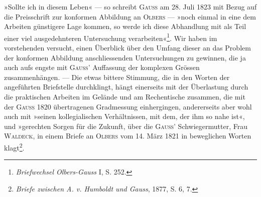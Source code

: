»Sollte ich in diesem Leben« — so schreibt \textsc{Gauss} am 28. Juli 1823 mit
Bezug auf die Preisschrift zur konformen Abbildung an \textsc{Olbers} — »noch einmal
in eine dem Arbeiten günstigere Lage kommen, so werde ich diese Abhandlung
mit als Teil einer viel ausgedehnteren Untersuchung verarbeiten«\footnote{\textit{Briefwechsel Olbers-Gauss} I, S. 252.}.
Wir haben im vorstehenden versucht, einen Überblick über den Umfang dieser
an das Problem der konformen Abbildung anschliessenden Untersuchungen zu
gewinnen, die ja auch aufs engste mit \textsc{Gauss}' Auffassung der komplexen
Grössen zusammenhängen. — Die etwas bittere Stimmung, die in den Worten
der angeführten Briefstelle durchklingt, hängt einerseits mit der Überlastung
durch die praktischen Arbeiten im Gelände und am Rechentische zusammen,
die mit der \textsc{Gauss} 1820 übertragenen Gradmessung einhergingen, andererseits
aber wohl auch mit »seinen kollegialischen Verhältnissen, mit dem, der ihm
so nahe ist«, und »gerechten Sorgen für die Zukunft, über die \textsc{Gauss}' Schwiegermutter,
Frau \textsc{Waldeck}, in einem Briefe an \textsc{Olbers} vom 14. März 1821 in beweglichen
Worten klagt\footnote{\textit{Briefe zwischen A. v. Humboldt und Gauss}, 1877, S. 6, 7.}.
